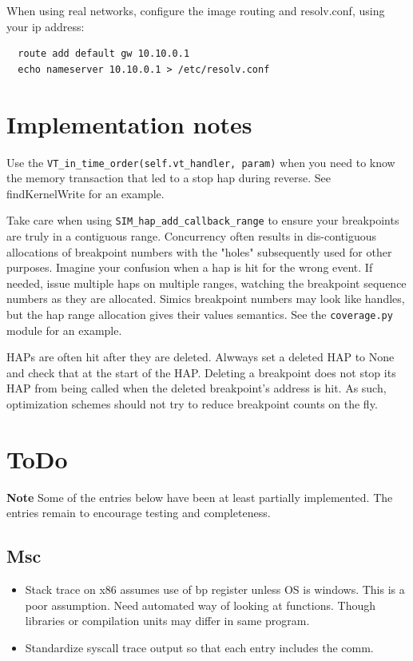 \documentclass[titlepage]{article}
\begin{document}
\begin{appendices}
When using real networks, configure the image routing and resolv.conf, using your ip address:
\begin{verbatim}
  route add default gw 10.10.0.1
  echo nameserver 10.10.0.1 > /etc/resolv.conf
\end{verbatim}


\section{Implementation notes}
Use the {\tt VT\_in\_time\_order(self.vt\_handler, param)} when you need to know the memory transaction that
led to a stop hap during reverse.  See findKernelWrite for an example.

Take care when using {\tt SIM\_hap\_add\_callback\_range} to ensure your breakpoints are truly in a contiguous range.
Concurrency often results in dis-contiguous allocations of breakpoint numbers with the "holes" subsequently used for other purposes.
Imagine your confusion when a hap is hit for the wrong event.  If needed, issue multiple haps on multiple ranges, watching the
breakpoint sequence numbers as they are allocated.  Simics breakpoint numbers may look like handles, but the hap range allocation 
gives their values semantics.  See the {\tt coverage.py} module for an example.

HAPs are often hit after they are deleted.  Alwways set a deleted HAP to None and check that at the start of the HAP.
Deleting a breakpoint does not stop its HAP from being called when the deleted breakpoint's address is hit.  As such,
optimization schemes should not try to reduce breakpoint counts on the fly.

\section{ToDo}
\textbf{Note} Some of the entries below have been at least partially implemented.  The entries remain to encourage testing and completeness.
\subsection {Msc}
\begin{itemize}
\item Stack trace on x86 assumes use of bp register unless OS is windows.  This is a poor assumption.  Need automated way
of looking at functions.  Though libraries or compilation units may differ in same program.

\item Standardize syscall trace output so that each entry includes the comm.


\end{itemize}
\end{appendices}
\end{document}
